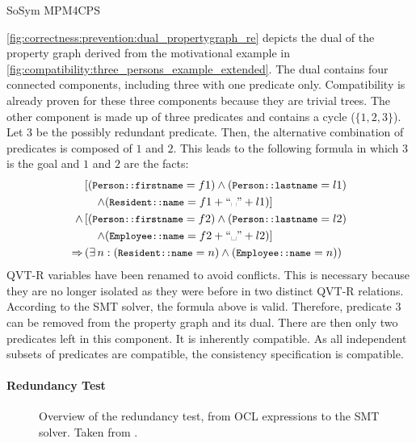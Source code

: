 \begin{copiedFrom}{SoSym MPM4CPS}
\begin{example}
\autoref{fig:correctness:prevention:dual_propertygraph_re} depicts the dual of the property graph derived from the motivational example in \autoref{fig:compatibility:three_persons_example_extended}. The dual contains four connected components, including three with one predicate only. Compatibility is already proven for these three components because they are trivial trees. The other component is made up of three predicates and contains a cycle ($\{1, 2, 3\}$).
Let $3$ be the possibly redundant predicate. Then, the alternative combination of predicates is composed of $1$ and $2$. This leads to the following formula in which $3$ is the goal and $1$ and $2$ are the facts:
\begin{align*}
    &\left[(\propdisplay{\small Person::firstname} = f1) \wedge (\propdisplay{\small Person::lastname} = l1)\right.\\
    &\left.\formulaskip \wedge (\propdisplay{\small Resident::name} = f1 + ``\text{\textvisiblespace}" + l1)\right]\\
    \wedge & \left[(\propdisplay{\small Person::firstname} = f2) \wedge (\propdisplay{\small Person::lastname} = l2)\right.\\
    &\left.\formulaskip \wedge (\propdisplay{\small Employee::name} = f2 + ``\text{\textvisiblespace}" + l2)\right]\\
    \Rightarrow & \left(\exists n : (\propdisplay{\small Resident::name} = n) \wedge (\propdisplay{\small Employee::name} = n)\right)
\end{align*}
QVT-R variables have been renamed to avoid conflicts. This is necessary because they are no longer isolated as they were before in two distinct QVT-R relations. According to the SMT solver, the formula above is valid. Therefore, predicate $3$ can be removed from the property graph and its dual. There are then only two predicates left in this component. It is inherently compatible. As all independent subsets of predicates are compatible, the consistency specification is compatible.
\end{example}
    
\paragraph{Redundancy Test}

\begin{figure*}
    \centering
    \resizebox{\linewidth}{!}{}
    \caption[Redundancy test overview]{Overview of the redundancy test, from OCL expressions to the SMT solver. Taken from .}
    \label{fig:correctness:prevention:redundancytest}
\end{figure*}


\end{copiedFrom}
